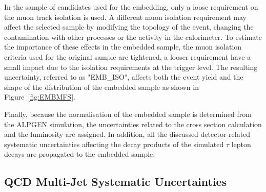 %
%	
%

In the sample of  \Zmumu candidates used for the embedding,  only a loose requirement on the  muon track isolation is used.
A different  muon isolation requirement may affect the selected sample by modifying the topology of the event, 
changing the contamination with other processes or the activity in the calorimeter. 
To estimate  the importance of these effects in the
embedded sample, the muon isolation criteria used for  the original \Zmumu sample are tightened,
a looser requirement have a  small impact due to the isolation requirements at the trigger level.
The resulting uncertainty, referred to as "EMB\_ISO", affects both the event yield and the shape of 
the \mmc  distribution of the embedded sample as shown in Figure~\ref{fig:EMBMFS}. 

Finally, because the normalisation of the embedded sample is determined from the ALPGEN simulation, 
the uncertainties related to the cross section calculation and the luminosity are assigned. In addition,
all the discussed detector-related systematic uncertainties affecting the decay products of the simulated $\tau$ lepton 
decays are propagated to the embedded sample.

 

\subsection{QCD Multi-Jet Systematic Uncertainties}\label{sec:qcdsys}

